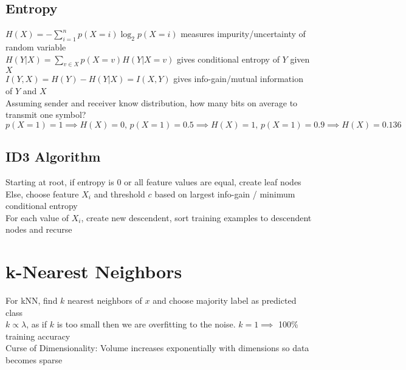 \documentclass{article}
\begin{document}
\subsection{Entropy}
$H(X) = -\sum \limits_{i=1}^n p(X = i)\log_2 p(X=i)$ measures impurity/uncertainty of random variable \\
$H(Y| X) = \sum \limits_{v \in X}p(X = v)H(Y | X = v)$ gives conditional entropy of $Y$ given $X$ \\
$I(Y, X) = H(Y) - H(Y|X) = I(X, Y)$ gives info-gain/mutual information of $Y$ and $X$ \\
Assuming sender and receiver know distribution, how many bits on average to transmit one symbol? \\
${p(X = 1) = 1 \implies H(X) = 0\mbox{, } p(X = 1) = 0.5 \implies H(X) = 1\mbox{, } p(X = 1) = 0.9 \implies H(X) = 0.136}$ 
\subsection{ID3 Algorithm}
Starting at root, if entropy is 0 or all feature values are equal, create leaf nodes \\
Else, choose feature $X_i$ and threshold $c$ based on largest info-gain / minimum conditional entropy \\
For each value of $X_i$, create new descendent, sort training examples to descendent nodes and recurse

\section{k-Nearest Neighbors}
For kNN, find $k$ nearest neighbors of $x$ and choose majority label as predicted class \\
$k \propto \lambda$, as if $k$ is too small then we are overfitting to the noise. $k=1 \implies$ 100\% training accuracy \\
Curse of Dimensionality: Volume increases exponentially with dimensions so data becomes sparse

\newpage
\end{document}

